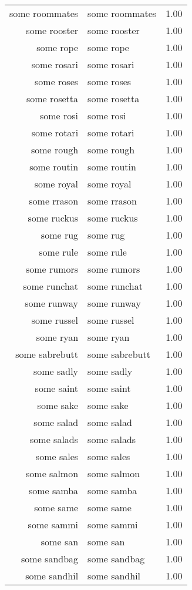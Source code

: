\begin{table}[ht]
\begin{tabular}{rlr}
  some roommates & some roommates & 1.00 \\ 
  some rooster & some rooster & 1.00 \\ 
  some rope & some rope & 1.00 \\ 
  some rosari & some rosari & 1.00 \\ 
  some roses & some roses & 1.00 \\ 
  some rosetta & some rosetta & 1.00 \\ 
  some rosi & some rosi & 1.00 \\ 
  some rotari & some rotari & 1.00 \\ 
  some rough & some rough & 1.00 \\ 
  some routin & some routin & 1.00 \\ 
  some royal & some royal & 1.00 \\ 
  some rrason & some rrason & 1.00 \\ 
  some ruckus & some ruckus & 1.00 \\ 
  some rug & some rug & 1.00 \\ 
  some rule & some rule & 1.00 \\ 
  some rumors & some rumors & 1.00 \\ 
  some runchat & some runchat & 1.00 \\ 
  some runway & some runway & 1.00 \\ 
  some russel & some russel & 1.00 \\ 
  some ryan & some ryan & 1.00 \\ 
  some sabrebutt & some sabrebutt & 1.00 \\ 
  some sadly & some sadly & 1.00 \\ 
  some saint & some saint & 1.00 \\ 
  some sake & some sake & 1.00 \\ 
  some salad & some salad & 1.00 \\ 
  some salads & some salads & 1.00 \\ 
  some sales & some sales & 1.00 \\ 
  some salmon & some salmon & 1.00 \\ 
  some samba & some samba & 1.00 \\ 
  some same & some same & 1.00 \\ 
  some sammi & some sammi & 1.00 \\ 
  some san & some san & 1.00 \\ 
  some sandbag & some sandbag & 1.00 \\ 
  some sandhil & some sandhil & 1.00 \\ 

\end{tabular}
\end{table}
